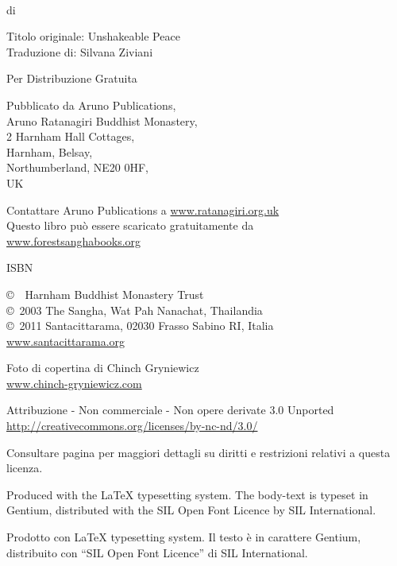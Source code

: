 {\small\setlength{\parskip}{0.8em}\setlength{\parindent}{0em}%
{\raggedright%

\thetitle\\
di \theauthor

Titolo originale: Unshakeable Peace\\
Traduzione di: Silvana Ziviani

Per Distribuzione Gratuita

Pubblicato da Aruno Publications,\\
Aruno Ratanagiri Buddhist Monastery,\\
2 Harnham Hall Cottages,\\
Harnham, Belsay,\\
Northumberland, NE20 0HF,\\
UK

Contattare Aruno Publications a \href{http://ratanagiri.org.uk}{www.ratanagiri.org.uk}\\
Questo libro può essere scaricato gratuitamente da\\
\href{http://forestsanghabooks.org/}{www.forestsanghabooks.org}

ISBN \theISBN

\copyright\ \the\year\ Harnham Buddhist Monastery Trust\\
\copyright\ 2003 The Sangha, Wat Pah Nanachat, Thailandia\\
\copyright\ 2011 Santacittarama, 02030 Frasso Sabino RI, Italia\\
\href{http://www.santacittarama.org/}{www.santacittarama.org}

Foto di copertina di Chinch Gryniewicz\\
\href{http://chinch-gryniewicz.com}{www.chinch-gryniewicz.com}

\vfill

{\footnotesize
Attribuzione - Non commerciale - Non opere derivate 3.0 Unported\\
\href{http://creativecommons.org/licenses/by-nc-nd/3.0/}{http://creativecommons.org/licenses/by-nc-nd/3.0/}

Consultare pagina \pageref{copyright-details} per maggiori dettagli su diritti e restrizioni relativi a questa licenza.

Produced with the {\selectfont\LaTeX} typesetting system. The body-text is typeset in Gentium, distributed with the SIL Open Font Licence by SIL International.

Prodotto con {\selectfont\LaTeX} typesetting system. Il testo è in carattere Gentium, distribuito con ``SIL Open Font Licence'' di SIL International.

\theEditionInfo\\
\thePrintedByInfo

}
}}

